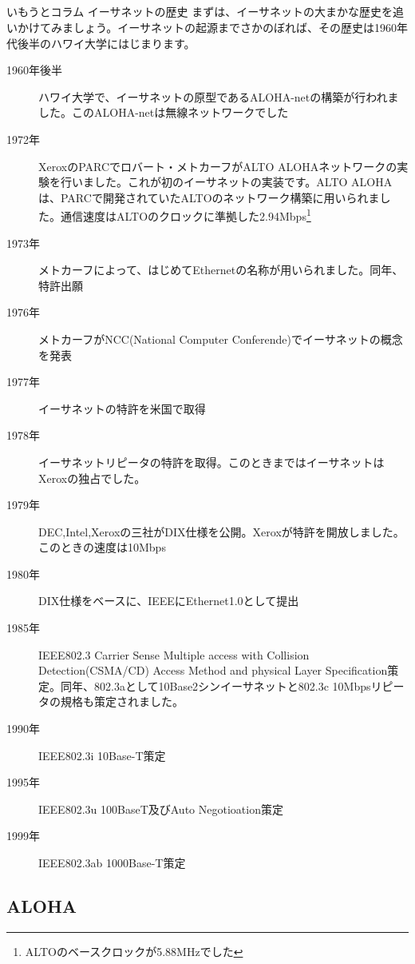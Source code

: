 \subsection*{}
\begin{itembox}[l]{いもうとコラム イーサネットの歴史}
まずは、イーサネットの大まかな歴史を追いかけてみましょう。イーサネットの起源までさかのぼれば、その歴史は1960年代後半のハワイ大学にはじまります。

\begin{description}
\item[1960年後半]ハワイ大学で、イーサネットの原型であるALOHA-netの構築が行われました。このALOHA-netは無線ネットワークでした
\item[1972年]XeroxのPARCでロバート・メトカーフがALTO ALOHAネットワークの実験を行いました。これが初のイーサネットの実装です。ALTO ALOHAは、PARCで開発されていたALTOのネットワーク構築に用いられました。通信速度はALTOのクロックに準拠した2.94Mbps\footnote{ALTOのベースクロックが5.88MHzでした}
\item[1973年]メトカーフによって、はじめてEthernetの名称が用いられました。同年、特許出願
\item[1976年]メトカーフがNCC(National Computer Conferende)でイーサネットの概念を発表
\item[1977年]イーサネットの特許を米国で取得
\item[1978年]イーサネットリピータの特許を取得。このときまではイーサネットはXeroxの独占でした。
\item[1979年]DEC,Intel,Xeroxの三社がDIX仕様を公開。Xeroxが特許を開放しました。このときの速度は10Mbps
\item[1980年]DIX仕様をベースに、IEEEにEthernet1.0として提出
\item[1985年]IEEE802.3 Carrier Sense Multiple access with Collision Detection(CSMA/CD) Access Method and physical Layer Specification策定。同年、802.3aとして10Base2シンイーサネットと802.3c 10Mbpsリピータの規格も策定されました。
\item[1990年]IEEE802.3i 10Base-T策定
\item[1995年]IEEE802.3u 100BaseT及びAuto Negotioation策定
\item[1999年]IEEE802.3ab 1000Base-T策定
\end{description}

\end{itembox}


\subsection{ALOHA}

